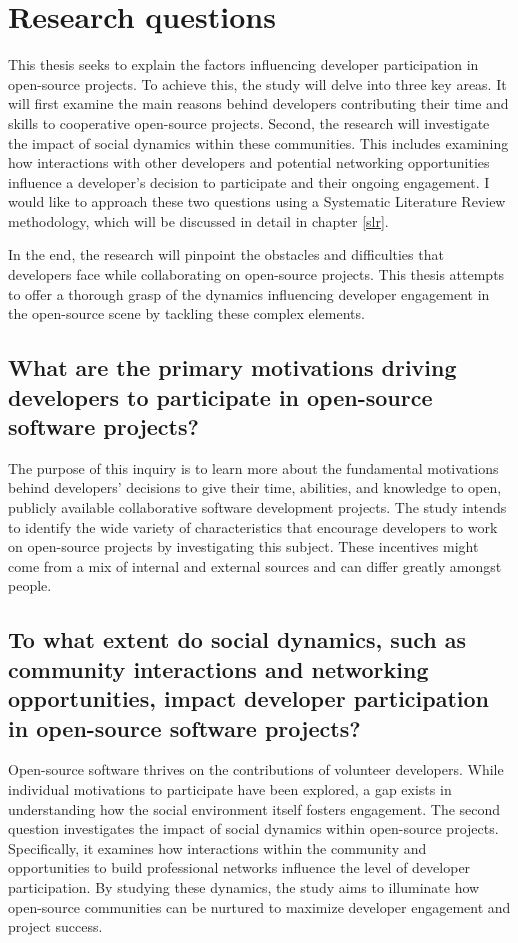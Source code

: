 \section{Research questions} \label{researchQuestions}
This thesis seeks to explain the factors influencing developer participation in open-source projects. To achieve this, the study will delve into three key areas. It will first examine the main reasons behind developers contributing their time and skills to cooperative open-source projects. Second, the research will investigate the impact of social dynamics within these communities. This includes examining how interactions with other developers and potential networking opportunities influence a developer's decision to participate and their ongoing engagement. I would like to approach these two questions using a Systematic Literature Review methodology, which will be discussed in detail in chapter \ref{slr}.

In the end, the research will pinpoint the obstacles and difficulties that developers face while collaborating on open-source projects. This thesis attempts to offer a thorough grasp of the dynamics influencing developer engagement in the open-source scene by tackling these complex elements.


\subsection{What are the primary motivations driving developers to participate in open-source software projects?}

The purpose of this inquiry is to learn more about the fundamental motivations behind developers' decisions to give their time, abilities, and knowledge to open, publicly available collaborative software development projects. The study intends to identify the wide variety of characteristics that encourage developers to work on open-source projects by investigating this subject. These incentives might come from a mix of internal and external sources and can differ greatly amongst people.


\subsection{To what extent do social dynamics, such as community interactions and networking opportunities, impact developer participation in open-source software projects?}

Open-source software thrives on the contributions of volunteer developers. While individual motivations to participate have been explored, a gap exists in understanding how the social environment itself fosters engagement. The second question investigates the impact of social dynamics within open-source projects. Specifically, it examines how interactions within the community and opportunities to build professional networks influence the level of developer participation. By studying these dynamics, the study aims to illuminate how open-source communities can be nurtured to maximize developer engagement and project success.


